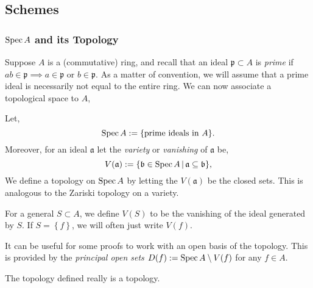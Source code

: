\documentclass[000-main.tex]{subfiles}
\begin{document}
\subsection{Schemes}%
\label{sec:schemes}

\subsubsection{$\operatorname{Spec} A$ and its Topology}

Suppose $A$ is a (commutative) ring, and recall that an ideal $\mathfrak{p}\subset A$ is \emph{prime} if $ab\in\mathfrak{p}\implies a\in \mathfrak{p}$ or $b\in\mathfrak{p}$.
As a matter of convention, we will assume that a prime ideal is necessarily not equal to the entire ring.
We can now associate a topological space to $A$,
\begin{definition}
  Let,
  \[
	\operatorname{Spec} A := \lbrace\text{prime ideals in }A\rbrace.
  \]
  Moreover, for an ideal $\mathfrak{a}$ let the \emph{variety} or \emph{vanishing} of $\mathfrak{a}$ be,
  \[
	V(\mathfrak{a}) := \lbrace\mathfrak{b} \in \operatorname{Spec} A \, | \, \mathfrak{a} \subseteq \mathfrak{b} \rbrace,
  \]
  We define a topology on $\operatorname{Spec} A$ by letting the $V(\mathfrak{a})$ be the closed sets.
  This is analogous to the Zariski topology on a variety.
\end{definition}

\begin{remark}
  For a general $S\subset A$, we define $V(S)$ to be the vanishing of the ideal generated by $S$.
  If $S = \left\{ f \right\}$, we will often just write $V(f)$.

  It can be useful for some proofs to work with an open basis of the topology.
  This is provided by the \emph{principal open sets} $D(f) := \operatorname{Spec} A\setminus V(f)$ for any $f \in A$.
\end{remark}

\begin{lemma}
  The topology defined really is a topology.
\end{lemma} 
\end{document}
